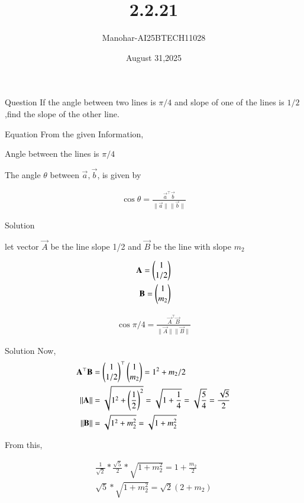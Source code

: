 \documentclass{beamer}
\title 
{2.2.21}
\date{August 31,2025}
\author 
{Manohar-AI25BTECH11028}
\begin{document}
\frame{\titlepage}
\begin{frame}{Question}
If the angle between two lines is $\pi/4$ and slope of one of the lines is $1/2$,find the slope of the other line.
\end{frame}





\begin{frame}{Equation}
From the given Information,

Angle between the lines is $\pi/4$

The angle $\theta$ between $\vec{a},\vec{b}$, is given by 

\begin{align}
\cos \theta = \frac{\vec{a}^\top \vec{b}}{\|\vec{a}\| \|\vec{b}\|}
\end{align}
\end{frame}
\begin{frame}{Solution}

let vector $\vec{A}$ be the line slope 1/2  and $\vec{B}$ be the line with slope $m_2$

\begin{align}
    \mathbf{A}=\begin{pmatrix}1\\ 1/2\end{pmatrix} \\
    \mathbf{B}=\begin{pmatrix}1\\m_2\end{pmatrix}
\end{align}

\begin{align}
    \cos{\pi/4} = \frac{\vec{A}^\top \vec{B}}{\|\vec{A}\| \|\vec{B}\|}
\end{align}


\end{frame}

\begin{frame}{Solution}
Now,
\begin{align}
       \mathbf{A}^\top \mathbf{B}&=\begin{pmatrix}1\\1/2\end{pmatrix}^\top \begin{pmatrix}1\\m_2\end{pmatrix}=1^2+m_2/2\\
\|\mathbf{A}\| &= \sqrt{1^2 + \left(\frac{1}{2}\right)^2} = \sqrt{1 + \frac{1}{4}} = \sqrt{\frac{5}{4}} = \frac{\sqrt{5}}{2} \\
\|\mathbf{B}\| &= \sqrt{1^2 + m_2^2} = \sqrt{1 + m_2^2}
\end{align}

From this,

\begin{align}
    \frac{1}{\sqrt{2}}*\frac{\sqrt{5}}{2}*\sqrt{1+m_2^2}=1+\frac{m_2}{2}\\
    \sqrt{5}*\sqrt{1+m_2^2}=\sqrt{2}(2+m_2)
\end{align}
 

\end{frame}
\end{document}
